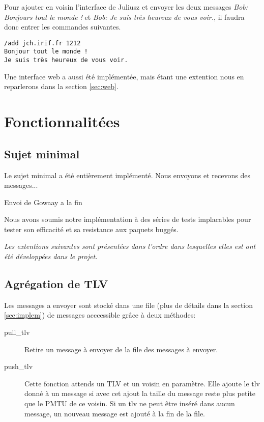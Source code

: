\documentclass[a4paper,10pt]{article} %
\begin{document}
Pour ajouter en voisin l'interface de Juliusz et envoyer les deux messages \textit{Bob: Bonjours tout le monde !} et \textit{Bob: Je suis très heureux de vous voir.}, il faudra donc entrer les commandes suivantes.

\begin{verbatim}
/add jch.irif.fr 1212
Bonjour tout le monde !
Je suis très heureux de vous voir.
\end{verbatim}

Une interface web a aussi été implémentée, mais étant une extention nous en reparlerons dans la section \ref{sec:web}.

\section{Fonctionnalitées}

\subsection{Sujet minimal}
Le sujet minimal a été entièrement implémenté.
Nous envoyons et recevons des messages...

Envoi de Gowaay a la fin

Nous avons soumis notre implémentation à des séries de tests implacables pour tester son efficacité et sa resistance aux paquets buggés.


\textit{Les extentions suivantes sont présentées dans l'ordre dans lesquelles elles est ont été développées dans le projet.}

\subsection{Agrégation de TLV\label{sec:agrega}}
Les messages a envoyer sont stocké dans une file (plus de détails dans la section \ref{sec:implem}) de messages acccessible grâce à deux méthodes:

\begin{description}
\item[pull\_tlv] Retire un message à envoyer de la file des messages à envoyer.
\item[push\_tlv] Cette fonction attends un TLV et un voisin en paramètre. Elle ajoute le tlv donné à un message si avec cet ajout la taille du message reste plus petite que le PMTU de ce voisin. Si un tlv ne peut être inséré dans aucun message, un nouveau message est ajouté à la fin de la file.
\end{description}
\end{document}
